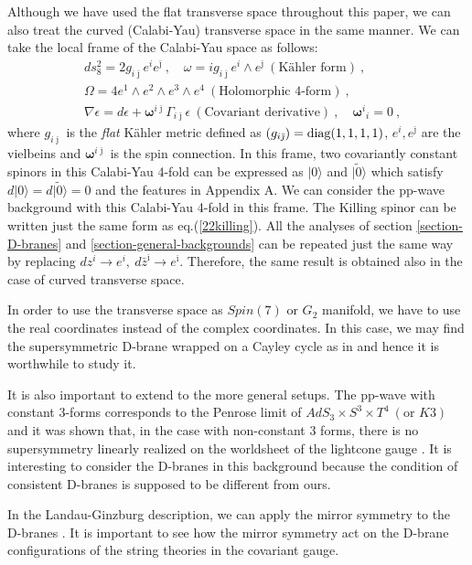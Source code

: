 \documentclass[a4paper,12pt]{article}
\numberwithin{equation}{section}
\newcommand{\ib}{\bar{\imath}}
\newcommand{\jb}{\bar{\jmath}}
\newcommand{\vac}{|0\rangle}
\newcommand{\vact}{|\tilde 0\rangle}
\newcommand{\nn}{\nonumber\\}
\begin{document}
Although we have used the flat transverse space throughout this paper,
we can also treat the curved (Calabi-Yau) transverse space in the same manner.
We can take the local frame of the Calabi-Yau space as follows:
\begin{align}
 &ds^2_{8}=2 g_{i\jb}e^{i}e^{\jb}~,\quad \omega=i g_{i\jb}e^{i}\wedge e^{\jb}\ 
 (\text{K\"ahler form})~,\nn
 &\Omega=4 e^{1}\wedge e^{2}\wedge e^{3}\wedge e^{4} \ 
   (\text{Holomorphic 4-form})~,\nn
 & \nabla \epsilon =d\epsilon + \boldsymbol{\omega}^{i\jb}\Gamma_{i\jb}\epsilon
  \ (\text{Covariant derivative})~,\quad 
 \boldsymbol{\omega}^{i}{}_{i}=0~,
\end{align}
where $g_{i\jb}$ is the {\em flat} K\"ahler metric defined
as $(g_{i\jb})={\rm diag(1,1,1,1)}$,  $e^{i}, e^{\jb}$ are the vielbeins and
$\boldsymbol{\omega}^{i\jb}$
is the spin connection. In this frame, two covariantly constant
spinors in this Calabi-Yau 4-fold can be expressed as $\vac$ and $\vact$
which satisfy $d \vac= d \vact=0$ and the features in Appendix A.
We can consider the pp-wave background with this Calabi-Yau 
4-fold \cite{Maldacena:2002fy} in this frame.
The Killing spinor can be written just
the same form as eq.(\ref{22killing}). All the analyses of section 
\ref{section-D-branes} and \ref{section-general-backgrounds} can be repeated
just the same way by replacing $dz^{i}\to e^{i},\ d\bar z^{\ib}\to e^{\ib}$.
Therefore, the same result is obtained also in the case of curved transverse
space.

In order to use the transverse space as $\mathit{Spin}(7)$ or $G_2$ manifold, 
we have to use the real coordinates instead of the complex coordinates. 
In this case, we may find the supersymmetric D-brane wrapped on a Cayley
cycle as in \cite{Becker:1996ay} and hence it is worthwhile to study it.

It is also important to extend to the more general setups.
The pp-wave with constant 3-forms corresponds to the Penrose limit
of $AdS_3 \times S^3 \times T^4 \ (\mbox{or } K3)$ 
\cite{Hikida:2002in,Lunin:2002fw,Gomis:2002qi,Hikida:2002xu,Gava:2002xb}
and it was shown that, in the case with
non-constant 3 forms, there is no supersymmetry
linearly realized on the worldsheet of the lightcone
gauge \cite{Russo:2002qj}. 
It is interesting to consider the D-branes in this background because
the condition of consistent D-branes is supposed to be different from ours.

In the Landau-Ginzburg description, we can apply the mirror symmetry to
the D-branes \cite{Hori:2000kt,Hori:2000ck}. 
It is important to see how the mirror
symmetry act on the D-brane configurations of 
the string theories in the covariant gauge.
\end{document}
